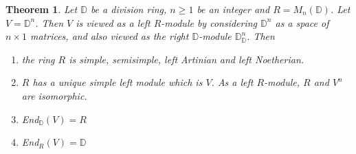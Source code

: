 \documentclass[12pt,letterpaper]{report}
\newtheorem{theorem}{Theorem}[section]
\begin{document}
\begin{theorem}Let $\mathbb{D}$ be a division ring, $n\geq1$ be an integer and $R=M_{n}(\mathbb{D})$. Let $V=\mathbb{D}^{n}$. Then $V$ is viewed as a left $R$-module by considering $\mathbb{D}^{n}$ as a space of $n\times 1$ matrices, and also viewed as the right $\mathbb{D}$-module $\mathbb{D}_{\mathbb{D}}^{n}$. Then \begin{enumerate}\item the ring $R$ is simple, semisimple, left Artinian and left Noetherian.
\item $R$ has a unique simple left module which is $V$. As a left $R$-module, $R$ and $V^{n}$ are isomorphic. \item End$_{\mathbb{D}}(V)=R$\item End$_{R}(V)=\mathbb{D}$\end{enumerate}\end{theorem}
\end{document}
